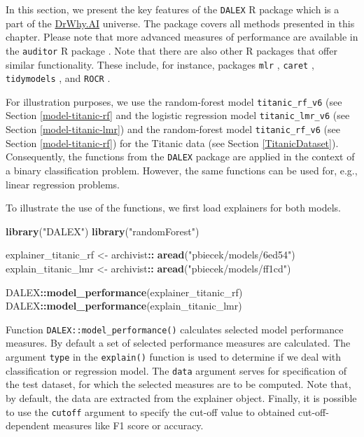 \documentclass[]{krantz}
\newenvironment{Shaded}{\begin{snugshade}}{\end{snugshade}}
\newcommand{\KeywordTok}[1]{\textcolor[rgb]{0.13,0.29,0.53}{\textbf{#1}}}
\newcommand{\NormalTok}[1]{#1}
\newcommand{\OperatorTok}[1]{\textcolor[rgb]{0.81,0.36,0.00}{\textbf{#1}}}
\newcommand{\StringTok}[1]{\textcolor[rgb]{0.31,0.60,0.02}{#1}}
\begin{document}
In this section, we present the key features of the \texttt{DALEX} R package which is a part of the \href{http://DrWhy.AI}{DrWhy.AI} universe. The package covers all methods presented in this chapter. Please note that more advanced measures of performance are available in the \texttt{auditor} R package \citep{R-auditor}.
Note that there are also other R packages that offer similar functionality. These include, for instance, packages \texttt{mlr} \citep{mlr}, \texttt{caret} \citep{caret}, \texttt{tidymodels} \citep{tidymodels}, and \texttt{ROCR} \citep{ROCR}.

For illustration purposes, we use the random-forest model \texttt{titanic\_rf\_v6} (see Section \ref{model-titanic-rf} and the logistic regression model \texttt{titanic\_lmr\_v6} (see Section \ref{model-titanic-lmr}) and the random-forest model \texttt{titanic\_rf\_v6} (see Section \ref{model-titanic-rf}) for the Titanic data (see Section \ref{TitanicDataset}). Consequently, the functions from the \texttt{DALEX} package are applied in the context of a binary classification problem. However, the same functions can be used for, e.g., linear regression problems.

To illustrate the use of the functions, we first load explainers for both models.

\begin{Shaded}
\begin{Highlighting}[]
\KeywordTok{library}\NormalTok{(}\StringTok{"DALEX"}\NormalTok{)}
\KeywordTok{library}\NormalTok{(}\StringTok{"randomForest"}\NormalTok{)}

\NormalTok{explainer_titanic_rf <-}\StringTok{ }\NormalTok{archivist}\OperatorTok{::}\StringTok{ }\KeywordTok{aread}\NormalTok{(}\StringTok{"pbiecek/models/6ed54"}\NormalTok{)}
\NormalTok{explain_titanic_lmr <-}\StringTok{ }\NormalTok{archivist}\OperatorTok{::}\StringTok{ }\KeywordTok{aread}\NormalTok{(}\StringTok{"pbiecek/models/ff1cd"}\NormalTok{)}

\NormalTok{DALEX}\OperatorTok{::}\KeywordTok{model_performance}\NormalTok{(explainer_titanic_rf)}
\NormalTok{DALEX}\OperatorTok{::}\KeywordTok{model_performance}\NormalTok{(explain_titanic_lmr)}
\end{Highlighting}
\end{Shaded}

Function \texttt{DALEX::model\_performance()} calculates selected model performance measures. By default a set of selected performance measures are calculated. The argument \texttt{type} in the \texttt{explain()} function is used to determine if we deal with classification or regression model.
The \texttt{data} argument serves for specification of the test dataset, for which the selected measures are to be computed. Note that, by default, the data are extracted from the explainer object. Finally, it is possible to use the \texttt{cutoff} argument to specify the cut-off value to obtained cut-off-dependent measures like F1 score or accuracy.
\end{document}

